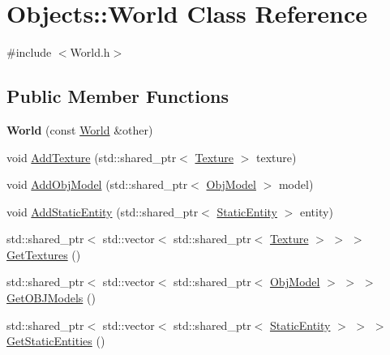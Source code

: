\hypertarget{class_objects_1_1_world}{}\section{Objects\+:\+:World Class Reference}
\label{class_objects_1_1_world}


{\ttfamily \#include $<$World.\+h$>$}

\subsection*{Public Member Functions}
\begin{DoxyCompactItemize}
\item 
\mbox{\label{class_objects_1_1_world_ae94afd14baa2b242fe12612a6a0a229b}} 
{\bfseries World} (const \hyperlink{class_objects_1_1_world}{World} \&other)
\item 
void \hyperlink{class_objects_1_1_world_af564fbdf334909ccc2e625be04d05b65}{Add\+Texture} (std\+::shared\+\_\+ptr$<$ \hyperlink{class_objects_1_1_texture}{Texture} $>$ texture)
\item 
void \hyperlink{class_objects_1_1_world_ad84eb295fb787e7217237e27560f1e41}{Add\+Obj\+Model} (std\+::shared\+\_\+ptr$<$ \hyperlink{class_objects_1_1_obj_model}{Obj\+Model} $>$ model)
\item 
void \hyperlink{class_objects_1_1_world_a8512010f2e623aafdeb68b86fc8a5efa}{Add\+Static\+Entity} (std\+::shared\+\_\+ptr$<$ \hyperlink{class_objects_1_1_static_entity}{Static\+Entity} $>$ entity)
\item 
std\+::shared\+\_\+ptr$<$ std\+::vector$<$ std\+::shared\+\_\+ptr$<$ \hyperlink{class_objects_1_1_texture}{Texture} $>$ $>$ $>$ \hyperlink{class_objects_1_1_world_a64f1de04ba2b729474135a8af6ac3163}{Get\+Textures} ()
\item 
std\+::shared\+\_\+ptr$<$ std\+::vector$<$ std\+::shared\+\_\+ptr$<$ \hyperlink{class_objects_1_1_obj_model}{Obj\+Model} $>$ $>$ $>$ \hyperlink{class_objects_1_1_world_a09762556086e4534f26af0e6092d794a}{Get\+O\+B\+J\+Models} ()
\item 
std\+::shared\+\_\+ptr$<$ std\+::vector$<$ std\+::shared\+\_\+ptr$<$ \hyperlink{class_objects_1_1_static_entity}{Static\+Entity} $>$ $>$ $>$ \hyperlink{class_objects_1_1_world_a8f430397fa8f3c30d2105f8d7e5268e3}{Get\+Static\+Entities} ()
\end{DoxyCompactItemize}


